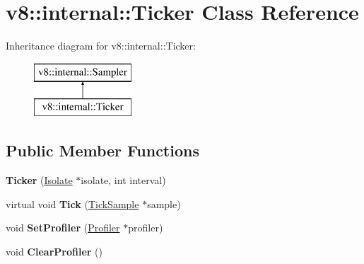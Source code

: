 \hypertarget{classv8_1_1internal_1_1_ticker}{}\section{v8\+:\+:internal\+:\+:Ticker Class Reference}
\label{classv8_1_1internal_1_1_ticker}
Inheritance diagram for v8\+:\+:internal\+:\+:Ticker\+:\begin{figure}[H]
\begin{center}
\leavevmode
\includegraphics[height=2.000000cm]{classv8_1_1internal_1_1_ticker}
\end{center}
\end{figure}
\subsection*{Public Member Functions}
\begin{DoxyCompactItemize}
\item 
{\bfseries Ticker} (\hyperlink{classv8_1_1internal_1_1_isolate}{Isolate} $\ast$isolate, int interval)\hypertarget{classv8_1_1internal_1_1_ticker_a3d6c206e5abfccfd37e9b1e8d3c17dd4}{}\label{classv8_1_1internal_1_1_ticker_a3d6c206e5abfccfd37e9b1e8d3c17dd4}

\item 
virtual void {\bfseries Tick} (\hyperlink{structv8_1_1internal_1_1_tick_sample}{Tick\+Sample} $\ast$sample)\hypertarget{classv8_1_1internal_1_1_ticker_a4c2806cf79f603b4a0026f237fb9b3ca}{}\label{classv8_1_1internal_1_1_ticker_a4c2806cf79f603b4a0026f237fb9b3ca}

\item 
void {\bfseries Set\+Profiler} (\hyperlink{classv8_1_1internal_1_1_profiler}{Profiler} $\ast$profiler)\hypertarget{classv8_1_1internal_1_1_ticker_a9bd275f6dca361cb4b1d7196967b4e0e}{}\label{classv8_1_1internal_1_1_ticker_a9bd275f6dca361cb4b1d7196967b4e0e}

\item 
void {\bfseries Clear\+Profiler} ()\hypertarget{classv8_1_1internal_1_1_ticker_adf0f145ffacc4b5030f921efc2089193}{}\label{classv8_1_1internal_1_1_ticker_adf0f145ffacc4b5030f921efc2089193}

\end{DoxyCompactItemize}
